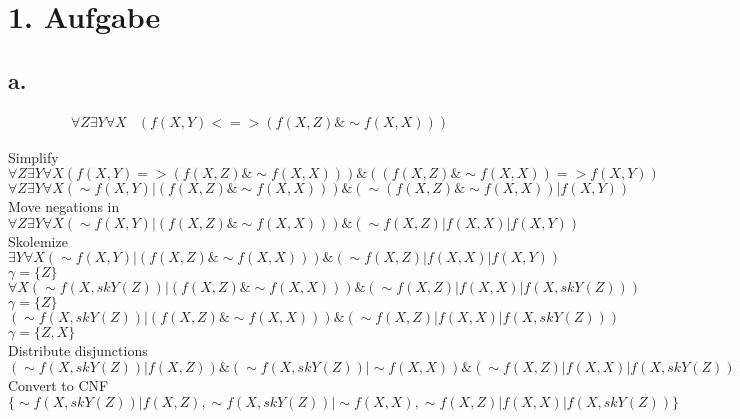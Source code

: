 \documentclass[11pt,a4paper]{article}
\begin{document}
  
\lfoot{} \cfoot{\thepage} \rfoot{}

\bigskip
\bigskip
\bigskip
\bigskip


\section*{1. Aufgabe}
\subsection*{a.}
\begin{equation*}
\begin{split}
\forall Z \exists Y \forall X &(f(X,Y) <=> (f(X,Z) \& \sim f(X,X)))
\end{split}
\end{equation*}

Simplify\\
$\forall Z \exists Y \forall X (f(X,Y) => (f(X,Z) \& \sim f(X,X))) \& ((f(X,Z) \& \sim f(X,X)) => f(X,Y))$ \\
$\forall Z \exists Y \forall X (\sim f(X,Y) | (f(X,Z) \& \sim f(X,X))) \& (\sim (f(X,Z) \& \sim f(X,X)) | f(X,Y))$ \\

Move negations in\\
$\forall Z \exists Y \forall X (\sim f(X,Y) | (f(X,Z) \& \sim f(X,X))) \& (\sim f(X,Z) | f(X,X) | f(X,Y))$ \\

Skolemize\\
$ \exists Y \forall X (\sim f(X,Y) | (f(X,Z) \& \sim f(X,X))) \& (\sim f(X,Z) | f(X,X) | f(X,Y))$ \\
$\gamma = \{Z\}$ \\
$ \forall X (\sim f(X,skY(Z)) | (f(X,Z) \& \sim f(X,X))) \& (\sim f(X,Z) | f(X,X) | f(X,skY(Z)))$ \\
$\gamma = \{Z\}$ \\
$ (\sim f(X,skY(Z)) | (f(X,Z) \& \sim f(X,X))) \& (\sim f(X,Z) | f(X,X) | f(X,skY(Z)))$ \\
$\gamma = \{Z,X\}$ \\

Distribute disjunctions\\
$ (\sim f(X,skY(Z)) | f(X,Z)) \& (\sim f(X,skY(Z)) | \sim f(X,X)) \& (\sim f(X,Z) | f(X,X) | f(X,skY(Z)))$ \\

Convert to CNF\\
$\{\sim f(X,skY(Z)) | f(X,Z) ,  \sim f(X,skY(Z)) | \sim f(X,X) ,  \sim f(X,Z) | f(X,X) | f(X,skY(Z)) \}$ \\
\end{document}
